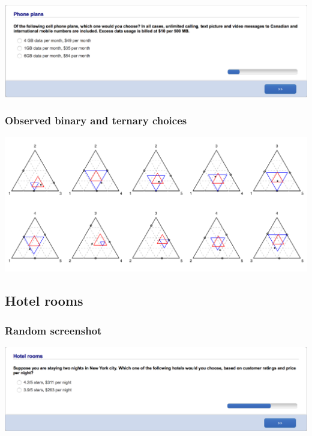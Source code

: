 \documentclass[11pt,letter]{article}
\begin{document}
\includegraphics[width=15cm]{Population_study_design/screenshot_Phone_Plans.png}

\subsubsection*{Observed binary and ternary choices}

\includegraphics[width=15cm]{./Population_study_data/Simplexes/Phone_plans.pdf}

\pagebreak

\subsection*{Hotel rooms}



\subsubsection*{Random screenshot}

\includegraphics[width=15cm]{Population_study_design/screenshot_Hotel_Rooms.png}
\end{document}
